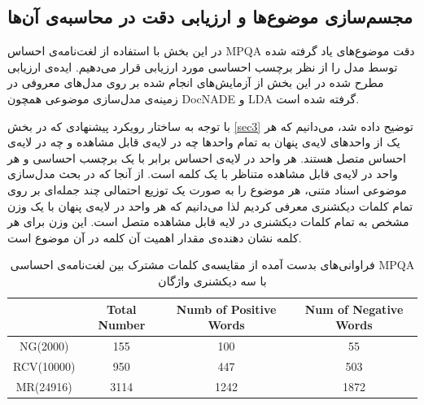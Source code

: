 \documentclass[12pt,a4paper]{article}
\begin{document}
\subsection{مجسم‌سازی موضوع‌ها و ارزیابی دقت در محاسبه‌ی آن‌ها}
\label{sec4-7}
در این بخش با استفاده از لغت‌نامه‌ی احساس MPQA دقت موضوع‌های یاد گرفته شده توسط مدل را از نظر برچسب احساسی مورد ارزیابی قرار می‌‌دهیم. ایده‌ی ارزیابی مطرح شده در این بخش از آزمایش‌های انجام شده بر روی مدل‌های معروفی‌ در زمینه‌ی مدل‌سازی موضوعی همچون DocNADE و LDA گرفته شده است. 

با توجه به ساختار رویکرد پیشنهادی که در بخش
\ref{sec3}
توضیح داده شد، می‌‌دانیم که هر یک از واحدهای لایه‌ی پنهان به تمام واحدها چه در لایه‌ی قابل مشاهده و چه در لایه‌ی احساس متصل هستند. هر واحد در لایه‌ی احساس برابر با یک برچسب احساسی‌ و هر واحد در لایه‌ی قابل مشاهده متناظر با یک کلمه است. از آنجا که در بحث مدل‌سازی موضوعی اسناد متنی، هر موضوع را به صورت یک توزیع احتمالی چند جمله‌ای بر روی تمام کلمات دیکشنری معرفی‌ کردیم لذا می‌دانیم که هر واحد در لایه‌ی پنهان با یک وزن مشخص به تمام کلمات دیکشنری در لایه قابل مشاهده متصل است. این وزن  برای هر کلمه نشان دهنده‌ی مقدار اهمیت آن کلمه در آن موضوع است.
\begin{table}[!t]
	\footnotesize
	\centering
	\begin{latin}
		\begin{tabular}{|c|c|c|c|}
			\hline     & Total Number & Numb of Positive Words & Num of Negative Words \\ \hline
			 NG(2000)  &     155      &          100           &          55           \\ \hline
			RCV(10000) &     950      &          447           &          503          \\ \hline
			MR(24916)  &     3114     &          1242          &         1872          \\ \hline
		\end{tabular}
	\end{latin}
	\caption{فراوانی‌های بدست آمده از مقایسه‌ی کلمات مشترک بین لغت‌نامه‌ی احساسی MPQA با سه دیکشنری واژگان}
	\label{tb4}
\end{table}
\end{document}
